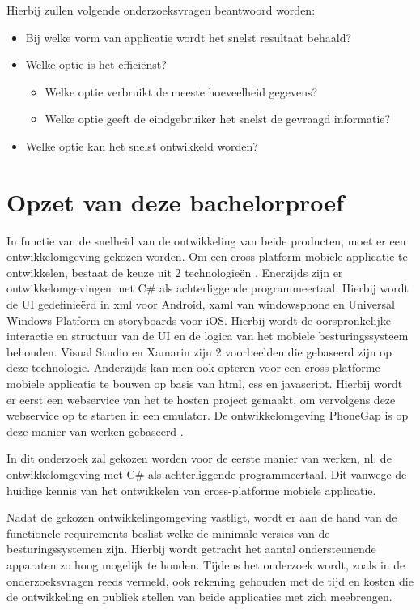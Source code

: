Hierbij zullen volgende onderzoeksvragen beantwoord worden:
\begin{itemize}
  \item{Bij welke vorm van applicatie wordt het snelst resultaat behaald?}
  \item{Welke optie is het efficiënst?}
  \begin{itemize}
    \item{Welke optie verbruikt de meeste hoeveelheid gegevens?}
    \item{Welke optie geeft de eindgebruiker het snelst de gevraagd informatie?}
  \end{itemize}
  \item{Welke optie kan het snelst ontwikkeld worden?}
\end{itemize}
\newpage
\section{Opzet van deze bachelorproef}
\label{sec:opzet-bachelorproef}
In functie van de snelheid van de ontwikkeling van beide producten, moet er een ontwikkelomgeving gekozen worden.
Om een cross-platform mobiele applicatie te ontwikkelen, bestaat de keuze uit 2 technologieën . Enerzijds zijn er
ontwikkelomgevingen met C\# als achterliggende programmeertaal. Hierbij wordt de UI gedefinieërd in xml voor Android,
xaml van windowsphone en Universal Windows Platform en storyboards voor iOS. Hierbij wordt de oorspronkelijke interactie
en structuur van de UI en de logica van het mobiele besturingssysteem behouden. Visual Studio en Xamarin zijn 2 voorbeelden
die gebaseerd zijn op deze technologie. Anderzijds kan men ook opteren voor een cross-platforme mobiele applicatie te bouwen op basis van html, css en javascript.
Hierbij wordt er eerst een webservice van het te hosten project gemaakt, om vervolgens deze webservice op te starten in een emulator.
De ontwikkelomgeving PhoneGap is op deze manier van werken gebaseerd \citep{adobesystemsinc.2017}.

In dit onderzoek zal gekozen worden voor de eerste manier van werken, nl. de ontwikkelomgeving met C\# als achterliggende
programmeertaal. Dit vanwege de huidige kennis van het ontwikkelen van cross-platforme mobiele applicatie.

Nadat de gekozen ontwikkelingomgeving vastligt, wordt er aan de hand van de functionele requirements beslist welke de
minimale versies van de besturingssystemen zijn. Hierbij wordt getracht het aantal ondersteunende apparaten zo hoog mogelijk te houden.
Tijdens het onderzoek wordt, zoals in de onderzoeksvragen reeds vermeld, ook rekening gehouden met de tijd en kosten die de ontwikkeling
en publiek stellen van beide applicaties met zich meebrengen.

